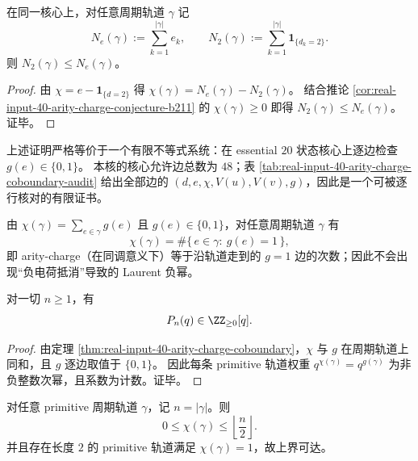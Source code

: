 \begin{corollary}\label{cor:real-input-40-arity-charge-collision-le-output}
在同一核心上，对任意周期轨道 \(\gamma\) 记
\[
N_e(\gamma):=\sum_{k=1}^{|\gamma|} e_k,
\qquad
N_2(\gamma):=\sum_{k=1}^{|\gamma|}\mathbf{1}_{\{d_k=2\}}.
\]
则 \(N_2(\gamma)\le N_e(\gamma)\)。
\end{corollary}
\begin{proof}
由 \(\chi=e-\mathbf{1}_{\{d=2\}}\) 得 \(\chi(\gamma)=N_e(\gamma)-N_2(\gamma)\)。
结合推论 \ref{cor:real-input-40-arity-charge-conjecture-b211} 的 \(\chi(\gamma)\ge 0\) 即得 \(N_2(\gamma)\le N_e(\gamma)\)。
证毕。
\end{proof}

\begin{remark}\label{rem:real-input-40-arity-charge-coboundary-audit}
上述证明严格等价于一个有限不等式系统：在 essential $20$ 状态核心上逐边检查 $g(e)\in\{0,1\}$。
本核的核心允许边总数为 $48$；表 \ref{tab:real-input-40-arity-charge-coboundary-audit} 给出全部边的 $(d,e,\chi,V(u),V(v),g)$，因此是一个可被逐行核对的有限证书。
\end{remark}


\begin{remark}\label{rem:real-input-40-arity-charge-pure-counting}
由 $\chi(\gamma)=\sum_{e\in\gamma}g(e)$ 且 $g(e)\in\{0,1\}$，对任意周期轨道 $\gamma$ 有
\[
\chi(\gamma)=\#\{\,e\in\gamma:\ g(e)=1\,\},
\]
即 arity-charge（在同调意义下）等于沿轨道走到的 $g=1$ 边的次数；因此不会出现“负电荷抵消”导致的 Laurent 负幂。
\end{remark}

\begin{corollary}\label{cor:real-input-40-arity-charge-no-laurent}
对一切 $n\ge 1$，有
\[
P_n(q)\in\ZZ_{\ge 0}[q].
\]
\end{corollary}

\begin{proof}
由定理 \ref{thm:real-input-40-arity-charge-coboundary}，$\chi$ 与 $g$ 在周期轨道上同和，且 $g$ 逐边取值于 $\{0,1\}$。
因此每条 primitive 轨道权重 $q^{\chi(\gamma)}=q^{g(\gamma)}$ 为非负整数次幂，且系数为计数。证毕。
\end{proof}

\begin{theorem}\label{thm:real-input-40-arity-charge-density-bound}
对任意 primitive 周期轨道 $\gamma$，记 $n=|\gamma|$。则
\[
0\le \chi(\gamma)\le \left\lfloor \frac{n}{2}\right\rfloor.
\]
并且存在长度 $2$ 的 primitive 轨道满足 $\chi(\gamma)=1$，故上界可达。
\end{theorem}

